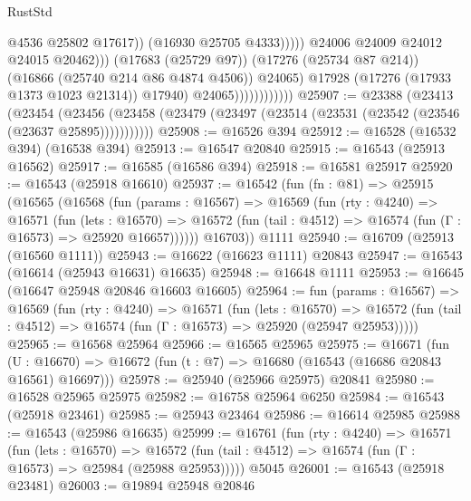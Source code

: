 \begin{lexlean}{RustStd}
\begin{coremodule}
                                                  @4536
                                                  @25802
                                                  @17617))
                                              (@16930 @25705 @4333)))))
                                      @24006
                                      @24009
                                      @24012
                                      @24015
                                      @20462)))
                                (@17683 (@25729 @97))
                                (@17276 (@25734 @87 @214))
                                (@16866 (@25740 @214 @86 @4874 @4506))
                                @24065)
                              @17928
                              (@17276 (@17933 @1373 @1023 @21314))
                              @17940)
                            @24065))))))))))))
@25907 := @23388
    (@23413
      (@23454
        (@23456 (@23458 (@23479 (@23497 (@23514 (@23531 (@23542 (@23546 (@23637 @25895)))))))))))
@25908 := @16526 @394
@25912 := @16528 (@16532 @394) (@16538 @394)
@25913 := @16547 @20840
@25915 := @16543 (@25913 @16562)
@25917 := @16585 (@16586 @394)
@25918 := @16581 @25917
@25920 := @16543 (@25918 @16610)
@25937 := @16542
    (fun (fn : @81) =>
    @25915
      (@16565
        (@16568
          (fun (params : @16567) =>
          @16569
            (fun (rty : @4240) =>
            @16571
              (fun (lets : @16570) =>
              @16572 (fun (tail : @4512) => @16574 (fun (Γ : @16573) => @25920 @16657))))))
        @16703))
    @1111
@25940 := @16709 (@25913 (@16560 @1111))
@25943 := @16622 (@16623 @1111) @20843
@25947 := @16543 (@16614 (@25943 @16631) @16635)
@25948 := @16648 @1111
@25953 := @16645 (@16647 @25948 @20846 @16603 @16605)
@25964 := fun (params : @16567) =>
  @16569
    (fun (rty : @4240) =>
    @16571
      (fun (lets : @16570) =>
      @16572 (fun (tail : @4512) => @16574 (fun (Γ : @16573) => @25920 (@25947 @25953)))))
@25965 := @16568 @25964
@25966 := @16565 @25965
@25975 := @16671
    (fun (U : @16670) => @16672 (fun (t : @7) => @16680 (@16543 (@16686 @20843 @16561) @16697)))
@25978 := @25940 (@25966 @25975) @20841
@25980 := @16528 @25965 @25975
@25982 := @16758 @25964 @6250
@25984 := @16543 (@25918 @23461)
@25985 := @25943 @23464
@25986 := @16614 @25985
@25988 := @16543 (@25986 @16635)
@25999 := @16761
    (fun (rty : @4240) =>
    @16571
      (fun (lets : @16570) =>
      @16572 (fun (tail : @4512) => @16574 (fun (Γ : @16573) => @25984 (@25988 @25953)))))
    @5045
@26001 := @16543 (@25918 @23481)
@26003 := @19894 @25948 @20846

\end{coremodule}
\end{lexlean}
